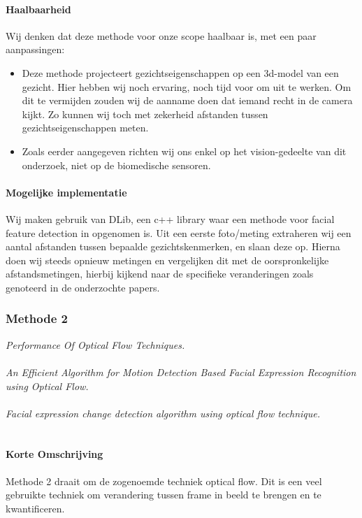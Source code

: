 \documentclass[11pt]{article}
\begin{document}
    \paragraph{Haalbaarheid}
    Wij denken dat deze methode voor onze scope haalbaar is, met een paar aanpassingen:
    \begin{itemize}
        \item Deze methode projecteert gezichtseigenschappen op een 3d-model van een gezicht.
        Hier hebben wij noch ervaring, noch tijd voor om uit te werken.
        Om dit te vermijden zouden wij de aanname doen dat iemand recht in de camera kijkt.
        Zo kunnen wij toch met zekerheid afstanden tussen gezichtseigenschappen meten.
        \item Zoals eerder aangegeven richten wij ons enkel op het vision-gedeelte van dit onderzoek, niet op de biomedische sensoren.
    \end{itemize}

    \paragraph{Mogelijke implementatie}
    Wij maken gebruik van DLib, een c++ library waar een methode voor facial feature detection in opgenomen is.
    Uit een eerste foto/meting extraheren wij een aantal afstanden tussen bepaalde gezichtskenmerken, en slaan deze op.
    Hierna doen wij steeds opnieuw metingen en vergelijken dit met de oorspronkelijke afstandsmetingen,
    hierbij kijkend naar de specifieke veranderingen zoals genoteerd in de onderzochte papers.

    \subsubsection{Methode 2}

    \emph{\citet{barronperformance} Performance Of Optical Flow Techniques.}\\ \\
    \emph{\citet{naghsh2006efficient} An Efficient Algorithm for Motion Detection Based Facial Expression Recognition using Optical Flow.}\\ \\
    \emph{\citet{zainudinfacialexpression} Facial expression change detection algorithm using optical flow technique.}\\ \\

    \paragraph{Korte Omschrijving}
    Methode 2 draait om de zogenoemde techniek optical flow.
    Dit is een veel gebruikte techniek om verandering tussen frame in beeld te brengen en te kwantificeren.
\end{document}
